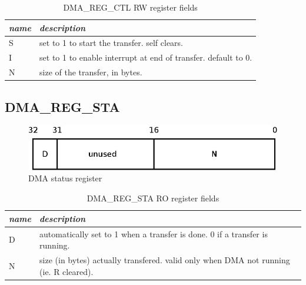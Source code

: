 \documentclass[a4paper, 11pt]{article}
\begin{document}
\begin{table}[!h]
\centering
\begin{scriptsize}
\begin{tabular}{|p{1cm}|p{12cm}|}
  \hline
  \textit{name} & \textit{description} \\
  \hline
  S
  &
  set to 1 to start the transfer. self clears. \\
  \hline
  I
  &
  set to 1 to enable interrupt at end of transfer. default to 0. \\
  \hline
  N
  &
  size of the transfer, in bytes. \\
  \hline
\end{tabular}
\end{scriptsize}
\caption{\tiny{DMA\_REG\_CTL RW register fields}}
\label{tab:dma_reg_ctl_fields}
\end{table}

\newpage
\subsection{DMA\_REG\_STA}

\begin{figure}[!h]
\begin{center}
\includegraphics[scale=0.20]{../pic/dma_reg_sta/main.jpeg}
\end{center}
\caption{\tiny{DMA status register}}
\label{dma_reg_sta}
\end{figure}

\begin{table}[!h]
\centering
\begin{scriptsize}
\begin{tabular}{|p{1cm}|p{12cm}|}
  \hline
  \textit{name} & \textit{description} \\
  \hline
  D
  &
  automatically set to 1 when a transfer is done. 0 if a transfer is running.\\
  \hline
  N
  &
  size (in bytes) actually transfered. valid only when DMA not running (ie. R cleared). \\
  \hline
\end{tabular}
\end{scriptsize}
\caption{\tiny{DMA\_REG\_STA RO register fields}}
\label{tab:dma_reg_sta_fields}
\end{table}
\end{document}
